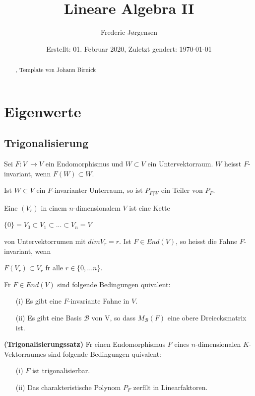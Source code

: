 \documentclass[11pt, a4paper]{article}
\title{Lineare Algebra II}
\author{Frederic Jørgensen}
\date{Erstellt: 01. Februar 2020, Zuletzt ge\aee ndert: \today \\                           %
	 \selectlanguage{ngerman}}
\begin{document}
\maketitle
\tableofcontents
\newpage
\begin{abstract}
	\centerline{, Template von Johann Birnick}
\end{abstract}
\section{Eigenwerte}
\subsection{Trigonalisierung}
\begin{definition}
Sei $F : V\ \rightarrow V$ ein Endomorphismus und $W \subset V$ ein Untervektorraum. $W$ heisst $F$-invariant, wenn $F(W) \subset W$.
\end{definition}
\begin{remark}
Ist $W \subset V$ ein $F$-invarianter Unterraum, so ist $P_{F|W}$ ein Teiler von $P_F$.
\end{remark}

\begin{definition}
Eine  $(V_r)$ in einem $n$-dimensionalem $V$ ist eine Kette 
\\ \centerline{ $\{0\} = V_0 \subset V_1 \subset ... \subset V_n = V$}
von Untervektorr\aee umen mit $dim V_r = r$. Ist $F \in End(V)$, so heisst die Fahne $F$-invariant, wenn 
\\ \centerline{$F(V_r) \subset V_r$ f\uee r alle $r \in \{0, ... n\}$.}
\end{definition}

\begin{remark}
F\uee r $F \in End(V)$ sind folgende Bedingungen \aee quivalent:
\begin{enumerate}
\item[(i)] Es gibt eine $F$-invariante Fahne in $V$.
\item[(ii)] Es gibt eine Basis $\mathcal{B}$ von V, so dass $M_\mathcal{B}  (F)$ eine obere Dreiecksmatrix ist.
\end{enumerate}
\end{remark}


\begin{theorem} \textbf{(Trigonalisierungssatz)} F\uee r einen Endomorphismus $F$ eines $n$-dimensionalen $K$-Vektorraumes sind folgende Bedingungen \aee quivalent:
\begin{enumerate}
\item[(i)] $F$ ist trigonalisierbar.
\item[(ii)] Das charakteristische Polynom $P_F$ zerf\aee llt in Linearfaktoren.
\end{enumerate}
\end{theorem}
\end{document}
